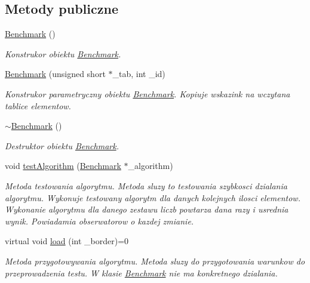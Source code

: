 \subsection*{Metody publiczne}
\begin{DoxyCompactItemize}
\item 
\hyperlink{class_benchmark_acfca497989836a688d44477802e822d8}{Benchmark} ()
\begin{DoxyCompactList}\small\item\em Konstrukor obiektu \hyperlink{class_benchmark}{Benchmark}. \end{DoxyCompactList}\item 
\hyperlink{class_benchmark_acca22b29e197ecf7f39a128488584c69}{Benchmark} (unsigned short $\ast$\-\_\-tab, int \-\_\-id)
\begin{DoxyCompactList}\small\item\em Konstrukor parametryczny obiektu \hyperlink{class_benchmark}{Benchmark}. Kopiuje wskazink na wczytana tablice elementow. \end{DoxyCompactList}\item 
\hyperlink{class_benchmark_a20476e07f09e2b20ed3e9a7f13a570e6}{$\sim$\-Benchmark} ()
\begin{DoxyCompactList}\small\item\em Destruktor obiektu \hyperlink{class_benchmark}{Benchmark}. \end{DoxyCompactList}\item 
void \hyperlink{class_benchmark_a0f684e2cd21b8ba825afe234d54fe67b}{test\-Algorithm} (\hyperlink{class_benchmark}{Benchmark} $\ast$\-\_\-algorithm)
\begin{DoxyCompactList}\small\item\em Metoda testowania algorytmu. Metoda sluzy to testowania szybkosci dzialania algorytmu. Wykonuje testowany algorytm dla danych kolejnych ilosci elementow. Wykonanie algorytmu dla danego zestawu liczb powtarza dana razy i usrednia wynik. Powiadamia obserwatorow o kazdej zmianie. \end{DoxyCompactList}\item 
virtual void \hyperlink{class_benchmark_a41f66d36949f1488facb8e3d49c99f67}{load} (int \-\_\-border)=0
\begin{DoxyCompactList}\small\item\em Metoda przygotowywania algorytmu. Metoda sluzy do przygotowania warunkow do przeprowadzenia testu. W klasie \hyperlink{class_benchmark}{Benchmark} nie ma konkretnego dzialania. \end{DoxyCompactList}\item 

\end{DoxyCompactItemize}
